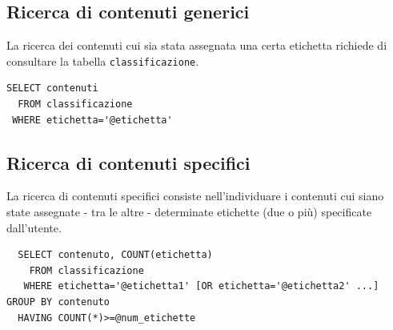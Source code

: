 \documentclass[10pt,a4paper,headinclude,footinclude,hidelinks]{scrreprt} %
\begin{document}
	\subsection{Ricerca di contenuti generici}
	La ricerca dei contenuti cui sia stata assegnata una certa etichetta richiede di consultare la tabella \texttt{classificazione}.
\begin{verbatim}
SELECT contenuti
  FROM classificazione
 WHERE etichetta='@etichetta'
\end{verbatim}

	\subsection{Ricerca di contenuti specifici}
	La ricerca di contenuti specifici consiste nell'individuare i contenuti cui siano state assegnate - tra le altre - determinate etichette (due o più) specificate dall'utente. 
\begin{verbatim}
  SELECT contenuto, COUNT(etichetta)
    FROM classificazione
   WHERE etichetta='@etichetta1' [OR etichetta='@etichetta2' ...]
GROUP BY contenuto
  HAVING COUNT(*)>=@num_etichette
\end{verbatim}

\end{document}
